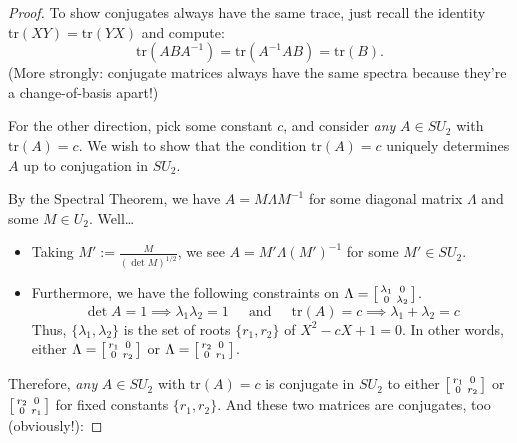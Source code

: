 \begin{proof}
    To show conjugates always have the same trace, just recall the identity $\mathrm{tr}(XY) = \mathrm{tr}(YX)$ and compute:
    \[ \mathrm{tr}(ABA^{-1}) = \mathrm{tr}(A^{-1}AB) = \mathrm{tr}(B). \]
    (More strongly: conjugate matrices always have the same spectra because they're a change-of-basis apart!)

    For the other direction, pick some constant $c$, and consider \emph{any} $A \in SU_2$ with $\mathrm{tr}(A) = c$.  We wish to show that the condition $\mathrm{tr}(A) = c$ uniquely determines $A$ up to conjugation in $SU_2$.
    
    By the Spectral Theorem, we have $A = M \Lambda M^{-1}$ for some diagonal matrix $\Lambda$ and some $M \in U_2$.  Well\dots
    \begin{itemize}
        \item Taking $M' := \frac{M}{(\det M)^{1/2}}$, we see $A = M' \Lambda (M')^{-1}$ for some $M' \in SU_2$.
        \item Furthermore, we have the following constraints on $\Lambda = \begin{bsmallmatrix} \lambda_1 & 0 \\ 0 & \lambda_2 \end{bsmallmatrix}$.
    \[ \det A = 1 \implies \lambda_1 \lambda_2 = 1 ~~~~~ \text{ and } ~~~~~ \mathrm{tr}(A) = c \implies \lambda_1 + \lambda_2 = c \]
    Thus, $\{\lambda_1, \lambda_2\}$ is the set of roots $\{r_1, r_2\}$ of $X^2 - cX + 1 = 0$.  In other words, either $\Lambda = \begin{bsmallmatrix} r_1 & 0 \\ 0 & r_2 \end{bsmallmatrix}$ or $\Lambda = \begin{bsmallmatrix} r_2 & 0 \\ 0 & r_1 \end{bsmallmatrix}$.
    \end{itemize}
    Therefore, \emph{any} $A \in SU_2$ with $\mathrm{tr}(A) = c$ is conjugate in $SU_2$ to either $\begin{bsmallmatrix} r_1 & 0 \\ 0 & r_2 \end{bsmallmatrix}$ or $\begin{bsmallmatrix} r_2 & 0 \\ 0 & r_1 \end{bsmallmatrix}$ for fixed constants $\{r_1, r_2\}$.  And these two matrices are conjugates, too (obviously!):

\end{proof}

